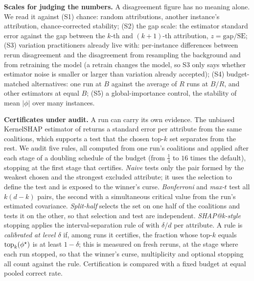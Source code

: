 \textbf{Scales for judging the numbers.}
A disagreement figure has no meaning alone. We read it against (S1) chance: random attributions, another instance's attribution, chance-corrected stability; (S2) the gap scale: the estimator standard error against the gap between the $k$-th and $(k{+}1)$-th attribution, $z=\text{gap}/\mathrm{SE}$; (S3) variation practitioners already live with: per-instance differences between rerun disagreement and the disagreement from resampling the background and from retraining the model (a retrain changes the model, so S3 only says whether estimator noise is smaller or larger than variation already accepted); (S4) budget-matched alternatives: one run at $B$ against the average of $R$ runs at $B/R$, and other estimators at equal $B$; (S5) a global-importance control, the stability of mean $|\phi|$ over many instances.


\textbf{Certificates under audit.}
A run can carry its own evidence. The unbiased KernelSHAP estimator of \citet{covert2021improving} returns a standard error per attribute from the same coalitions, which supports a test that the chosen top-$k$ set separates from the rest. We audit five rules, all computed from one run's coalitions and applied after each stage of a doubling schedule of the budget (from $\tfrac14$ to $16$ times the default), stopping at the first stage that certifies. \emph{Naive} tests only the pair formed by the weakest chosen and the strongest excluded attribute; it uses the selection to define the test and is exposed to the winner's curse. \emph{Bonferroni} and \emph{max-$t$} test all $k(d-k)$ pairs, the second with a simultaneous critical value from the run's estimated covariance. \emph{Split-half} selects the set on one half of the coalitions and tests it on the other, so that selection and test are independent. \emph{SHAP@k-style} stopping applies the interval-separation rule of \citet{kariyappa2024shapk} with $\delta/d$ per attribute. A rule is \emph{calibrated at level $\delta$} if, among runs it certifies, the fraction whose top-$k$ equals $\mathrm{top}_k(\phi^{\star})$ is at least $1-\delta$; this is measured on fresh reruns, at the stage where each run stopped, so that the winner's curse, multiplicity and optional stopping all count against the rule. Certification is compared with a fixed budget at equal pooled correct rate.
